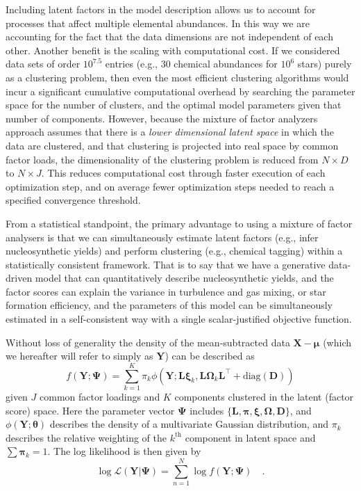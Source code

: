 \documentclass[twocolumn]{aastex62}
\newcommand{\vect}[1]{\boldsymbol{\mathbf{#1}}}
\renewcommand{\vec}[1]{\vect{#1}}
\newcommand{\weight}{\pi}
\newcommand{\data}{\textbf{Y}}
\newcommand{\vecdata}{\vec\data}
\newcommand{\vecdataunscaled}{\vec{X}}
\newcommand{\diag}[1]{\textrm{diag}(#1)}
\newcommand{\transpose}{^\intercal}
\newcommand{\factorloads}{\textbf{L}}
\newcommand{\specificvariance}{\vec{D}}
\newcommand{\scoremeans}{\vec\xi}
\newcommand{\scorecovs}{\vec\Omega}
\newcommand{\NumData}{N}
\newcommand{\numdata}{n}
\newcommand{\NumLatentFactors}{J}
\newcommand{\NumComponents}{K}
\newcommand{\numcomponents}{k}
\begin{document}
Including latent factors in the model description allows us to account for 
processes that affect multiple elemental abundances. In this way we are 
accounting for the fact that the data dimensions are not independent of
each other. Another benefit is the scaling with computational cost. If we 
considered data sets of order $10^{7.5}$
entries (e.g., 30 chemical abundances for $10^6$ stars) purely as a
clustering problem, then even the most efficient clustering
algorithms would incur a significant cumulative computational 
overhead by searching the parameter space for the number of
clusters, and the optimal model parameters given that number
of components. However, because the mixture of factor analyzers
approach assumes that there is a \emph{lower dimensional latent 
space} in which the data are clustered, and that clustering is 
projected into real space by common factor loads, the 
dimensionality of the clustering problem is reduced from 
$N \times D$ to $N \times J$. This reduces computational cost through
faster execution of each optimization step, and on average fewer optimization steps
needed to reach a specified convergence threshold.

From a statistical standpoint, the primary advantage to using
a mixture of factor analysers is that we can simultaneously
estimate latent factors (e.g., infer nucleosynthetic 
yields) and perform clustering (e.g., chemical tagging) 
within a statistically consistent framework. That is to say
that we have a generative data-driven model that can 
quantitatively describe nucleosynthetic yields, and the
factor scores can explain the variance in turbulence and gas mixing,
or star formation efficiency, and the parameters of this model
can be simultaneously estimated in a self-consistent way with
a single scalar-justified objective function.

Without loss of generality the density of the mean-subtracted 
data $\vecdataunscaled - \vec\mu$ (which we hereafter will refer to simply as $\vecdata$) can be described as 
\begin{equation}
	f(\vecdata; \vec\Psi) = \sum_{\numcomponents=1}^{\NumComponents}\weight_\numcomponents\phi(\vecdata;\factorloads\scoremeans_\numcomponents, \factorloads\scorecovs_\numcomponents\factorloads\transpose + \diag{\specificvariance})
\end{equation}
\noindent{}given $\NumLatentFactors$ common factor loadings and $\NumComponents$ components
clustered in the latent (factor score) space. Here the parameter
vector
$\vec\Psi$ includes $\{\factorloads,\vec\pi,\scoremeans,\scorecovs,\specificvariance\}$, and $\phi(\vecdata; \vec\theta)$
describes the density of a multivariate Gaussian distribution,
and $\weight_\numcomponents$ describes the relative weighting of the $\numcomponents^\mathrm{th}$
component in latent space and $\sum\vec\weight_{\numcomponents} = 1$.
The log likelihood is then given by
\begin{equation}
	\log\mathcal{L}(\vecdata|\vec\Psi) = \sum_{\numdata=1}^{\NumData}\log{f(\vecdata;\vec\Psi)} \quad . \label{eq:log-likelihood}
\end{equation}
\end{document}
